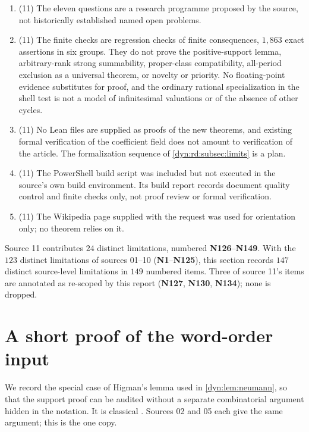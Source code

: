 \documentclass[11pt,letterpaper]{article}
\theoremstyle{definition}
\theoremstyle{remark}
\numberwithin{equation}{section}
\begin{document}
\begin{enumerate}[label=\textbf{N\arabic*.},ref=\textbf{N\arabic*},leftmargin=3.2em,start=126]
and set-based Hahn-field theory, or the definable classes of a conservative
class theory over ZFC, and no inaccessible cardinal or stronger hypothesis.
\item (11) The eleven questions are a research programme proposed by the
source, not historically established named open problems.
\item (11) The finite checks are regression checks of finite consequences,
$1{,}863$ exact assertions in six groups. They do not prove the
positive-support lemma, arbitrary-rank strong summability, proper-class
compatibility, all-period exclusion as a universal theorem, or novelty or
priority. No floating-point evidence substitutes for proof, and the ordinary
rational specialization in the shell test is not a model of infinitesimal
valuations or of the absence of other cycles.
\item (11) No Lean files are supplied as proofs of the new theorems, and
existing formal verification of the coefficient field does not amount to
verification of the article. The formalization sequence of
\cref{dyn:rd:subsec:limits} is a plan.
\item (11) The PowerShell build script was included but not executed in the
source's own build environment. Its build report records document quality
control and finite checks only, not proof review or formal verification.
\item\label{dyn:rd:nc:last} (11) The Wikipedia page supplied with the
request was used for orientation only; no theorem relies on it.
\end{enumerate}

\noindent Source 11 contributes $24$ distinct limitations, numbered
\textbf{N126}--\textbf{N149}. With the $123$ distinct limitations of sources
01--10 (\textbf{N1}--\textbf{N125}), this section records $147$ distinct
source-level limitations in $149$ numbered items. Three of source 11's items
are annotated as re-scoped by this report
(\textbf{N127}, \textbf{N130}, \textbf{N134}); none is dropped.

\appendix

\section{A short proof of the word-order input}
\label{dyn:app:higman}

We record the special case of Higman's lemma used in
\cref{dyn:lem:neumann}, so that the support proof can be audited without a
separate combinatorial argument hidden in the notation. It is classical
\cite{Higman}. Sources 02 and 05 each give the same argument; this is the
one copy.
\end{document}

